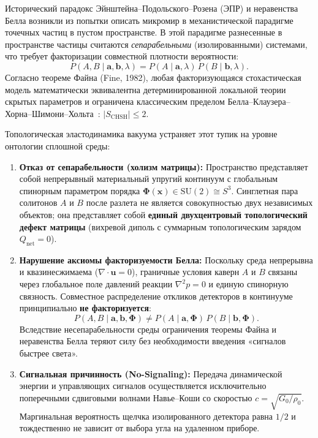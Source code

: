 \documentclass[11pt,a4paper]{article}
\theoremstyle{definition}
\theoremstyle{remark}
\begin{document}
Исторический парадокс Эйнштейна--Подольского--Розена (ЭПР) и неравенства Белла возникли из попытки описать микромир в механистической парадигме точечных частиц в пустом пространстве. В этой парадигме разнесенные в пространстве частицы считаются \textit{сепарабельными} (изолированными) системами, что требует факторизации совместной плотности вероятности:
\begin{equation}
    P(A, B \mid \mathbf{a}, \mathbf{b}, \lambda) = P(A \mid \mathbf{a}, \lambda) \, P(B \mid \mathbf{b}, \lambda).
    \label{eq:bell_factorization_axiom}
\end{equation}
Согласно теореме Файна (Fine, 1982), любая факторизующаяся стохастическая модель математически эквивалентна детерминированной локальной теории скрытых параметров и ограничена классическим пределом Белла--Клаузера--Хорна--Шимони--Хольта~\cite{Bell1964,CHSH1969}: $|S_{\mathrm{CHSH}}| \le 2$.

Топологическая эластодинамика вакуума устраняет этот тупик на уровне онтологии сплошной среды:
\begin{enumerate}
\item \textbf{Отказ от сепарабельности (холизм матрицы):} Пространство представляет собой непрерывный материальный упругий континуум с глобальным спинорным параметром порядка $\boldsymbol{\Phi}(\mathbf{x}) \in \mathrm{SU}(2) \cong S^3$. Синглетная пара солитонов $A$ и $B$ после разлета не является совокупностью двух независимых объектов; она представляет собой \textbf{единый двухцентровый топологический дефект матрицы} (вихревой диполь с суммарным топологическим зарядом $Q_{\mathrm{net}} = 0$).
\item \textbf{Нарушение аксиомы факторизуемости Белла:} Поскольку среда непрерывна и квазинесжимаема ($\nabla \cdot \mathbf{u} = 0$), граничные условия каверн $A$ и $B$ связаны через глобальное поле давлений реакции $\nabla^2 p = 0$ и единую спинорную связность. Совместное распределение откликов детекторов в континууме принципиально \textbf{не факторизуется}:
\begin{equation}
P(A, B \mid \mathbf{a}, \mathbf{b}, \boldsymbol{\Phi}) \ne P(A \mid \mathbf{a}, \boldsymbol{\Phi}) \, P(B \mid \mathbf{b}, \boldsymbol{\Phi}).
\label{eq:tev_non_factorizability}
\end{equation}
Вследствие несепарабельности среды ограничения теоремы Файна и неравенства Белла теряют силу без необходимости введения «сигналов быстрее света».
\item \textbf{Сигнальная причинность (No-Signaling):} Передача динамической энергии и управляющих сигналов осуществляется исключительно поперечными сдвиговыми волнами Навье--Коши со скоростью $c = \sqrt{G_0/\rho_0}$. Маргинальная вероятность щелчка изолированного детектора равна $1/2$ и тождественно не зависит от выбора угла на удаленном приборе.
\end{enumerate}
\end{document}

